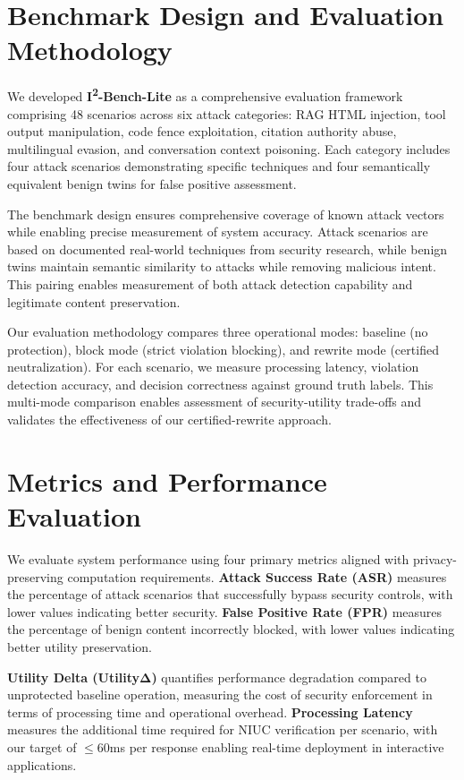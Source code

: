 \section{Benchmark Design and Evaluation Methodology}

We developed \textbf{I\textsuperscript{2}-Bench-Lite} as a comprehensive evaluation framework comprising 48 scenarios across six attack categories: RAG HTML injection, tool output manipulation, code fence exploitation, citation authority abuse, multilingual evasion, and conversation context poisoning. Each category includes four attack scenarios demonstrating specific techniques and four semantically equivalent benign twins for false positive assessment.

The benchmark design ensures comprehensive coverage of known attack vectors while enabling precise measurement of system accuracy. Attack scenarios are based on documented real-world techniques from security research, while benign twins maintain semantic similarity to attacks while removing malicious intent. This pairing enables measurement of both attack detection capability and legitimate content preservation.

Our evaluation methodology compares three operational modes: baseline (no protection), block mode (strict violation blocking), and rewrite mode (certified neutralization). For each scenario, we measure processing latency, violation detection accuracy, and decision correctness against ground truth labels. This multi-mode comparison enables assessment of security-utility trade-offs and validates the effectiveness of our certified-rewrite approach.

\section{Metrics and Performance Evaluation}

We evaluate system performance using four primary metrics aligned with privacy-preserving computation requirements. \textbf{Attack Success Rate (ASR)} measures the percentage of attack scenarios that successfully bypass security controls, with lower values indicating better security. \textbf{False Positive Rate (FPR)} measures the percentage of benign content incorrectly blocked, with lower values indicating better utility preservation.

\textbf{Utility Delta (UtilityΔ)} quantifies performance degradation compared to unprotected baseline operation, measuring the cost of security enforcement in terms of processing time and operational overhead. \textbf{Processing Latency} measures the additional time required for NIUC verification per scenario, with our target of \ensuremath{\leq}60ms per response enabling real-time deployment in interactive applications.

